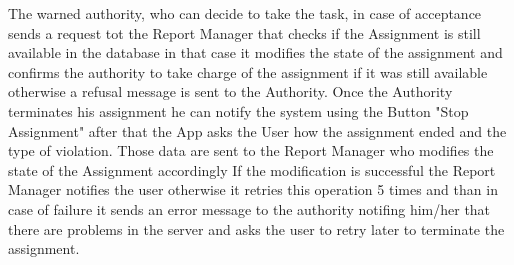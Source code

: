 The warned authority, who can decide to take the task, in case of acceptance sends a request tot the Report Manager that checks if the Assignment is still available in the database in that case it modifies the state of the assignment and confirms the authority to take charge of the assignment if it was still available otherwise a refusal message is sent to the Authority.
Once the Authority terminates his assignment he can notify the system using the Button "Stop Assignment" after that the App asks the User how the assignment ended and the type of violation. Those data are sent to the Report Manager who modifies the state of the Assignment accordingly If the modification is successful the Report Manager notifies the user otherwise it retries this operation 5 times and than in case of failure it sends an error message to the authority notifing him/her that there are problems in the server and asks the user to retry later to terminate the assignment.
